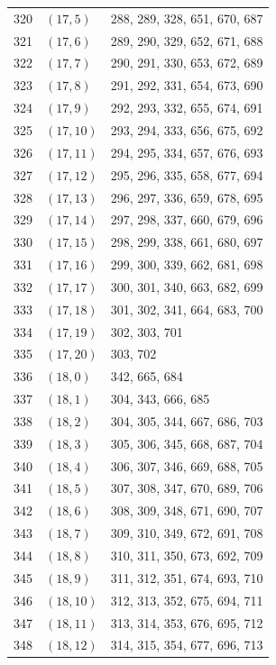 \documentclass{article}
\begin{document}
\begin{longtable}{lll}
  320 & \((17, 5)\) & 288, 289, 328, 651, 670, 687 \\
  321 & \((17, 6)\) & 289, 290, 329, 652, 671, 688 \\
  322 & \((17, 7)\) & 290, 291, 330, 653, 672, 689 \\
  323 & \((17, 8)\) & 291, 292, 331, 654, 673, 690 \\
  324 & \((17, 9)\) & 292, 293, 332, 655, 674, 691 \\
  325 & \((17, 10)\) & 293, 294, 333, 656, 675, 692 \\
  326 & \((17, 11)\) & 294, 295, 334, 657, 676, 693 \\
  327 & \((17, 12)\) & 295, 296, 335, 658, 677, 694 \\
  328 & \((17, 13)\) & 296, 297, 336, 659, 678, 695 \\
  329 & \((17, 14)\) & 297, 298, 337, 660, 679, 696 \\
  330 & \((17, 15)\) & 298, 299, 338, 661, 680, 697 \\
  331 & \((17, 16)\) & 299, 300, 339, 662, 681, 698 \\
  332 & \((17, 17)\) & 300, 301, 340, 663, 682, 699 \\
  333 & \((17, 18)\) & 301, 302, 341, 664, 683, 700 \\
  334 & \((17, 19)\) & 302, 303, 701 \\
  335 & \((17, 20)\) & 303, 702 \\
  336 & \((18, 0)\) & 342, 665, 684 \\
  337 & \((18, 1)\) & 304, 343, 666, 685 \\
  338 & \((18, 2)\) & 304, 305, 344, 667, 686, 703 \\
  339 & \((18, 3)\) & 305, 306, 345, 668, 687, 704 \\
  340 & \((18, 4)\) & 306, 307, 346, 669, 688, 705 \\
  341 & \((18, 5)\) & 307, 308, 347, 670, 689, 706 \\
  342 & \((18, 6)\) & 308, 309, 348, 671, 690, 707 \\
  343 & \((18, 7)\) & 309, 310, 349, 672, 691, 708 \\
  344 & \((18, 8)\) & 310, 311, 350, 673, 692, 709 \\
  345 & \((18, 9)\) & 311, 312, 351, 674, 693, 710 \\
  346 & \((18, 10)\) & 312, 313, 352, 675, 694, 711 \\
  347 & \((18, 11)\) & 313, 314, 353, 676, 695, 712 \\
  348 & \((18, 12)\) & 314, 315, 354, 677, 696, 713 \\

\end{longtable}
\end{document}
